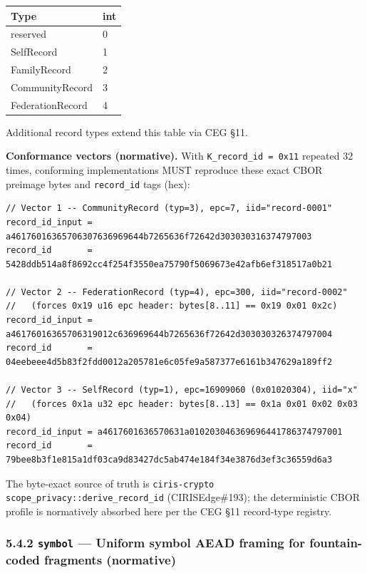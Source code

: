 \documentclass[11pt]{article}
\begin{document}
{\footnotesize
\begin{longtable}{|p{8.0cm}|p{8.0cm}|}\hline
\textbf{Type} & \textbf{int} \\ \hline\endhead
reserved & 0 \\ \hline
SelfRecord & 1 \\ \hline
FamilyRecord & 2 \\ \hline
CommunityRecord & 3 \\ \hline
FederationRecord & 4 \\ \hline
\end{longtable}}


Additional record types extend this table via CEG §11.


\textbf{Conformance vectors (normative).} With \texttt{K\_record\_id = 0x11} repeated 32 times, conforming implementations MUST reproduce these exact CBOR preimage bytes and \texttt{record\_id} tags (hex):


\begin{lstlisting}
// Vector 1 -- CommunityRecord (typ=3), epc=7, iid="record-0001"
record_id_input = a46176016365706307636969644b7265636f72642d303030316374797003
record_id       = 5428ddb514a8f8692cc4f254f3550ea75790f5069673e42afb6ef318517a0b21

// Vector 2 -- FederationRecord (typ=4), epc=300, iid="record-0002"
//   (forces 0x19 u16 epc header: bytes[8..11] == 0x19 0x01 0x2c)
record_id_input = a46176016365706319012c636969644b7265636f72642d303030326374797004
record_id       = 04eebeee4d5b83f2fdd0012a205781e6c05fe9a587377e6161b347629a189ff2

// Vector 3 -- SelfRecord (typ=1), epc=16909060 (0x01020304), iid="x"
//   (forces 0x1a u32 epc header: bytes[8..13] == 0x1a 0x01 0x02 0x03 0x04)
record_id_input = a4617601636570631a010203046369696441786374797001
record_id       = 79bee8b3f1e815a1df03ca9d83427dc5ab474e184f34e3876d3ef3c36559d6a3
\end{lstlisting}

The byte-exact source of truth is \texttt{ciris-crypto} \texttt{scope\_privacy::derive\_record\_id} (CIRISEdge\#193); the deterministic CBOR profile is normatively absorbed here per the CEG §11 record-type registry.


\subsubsection*{5.4.2 \texttt{symbol} — Uniform symbol AEAD framing for fountain-coded fragments (normative)}
\end{document}
